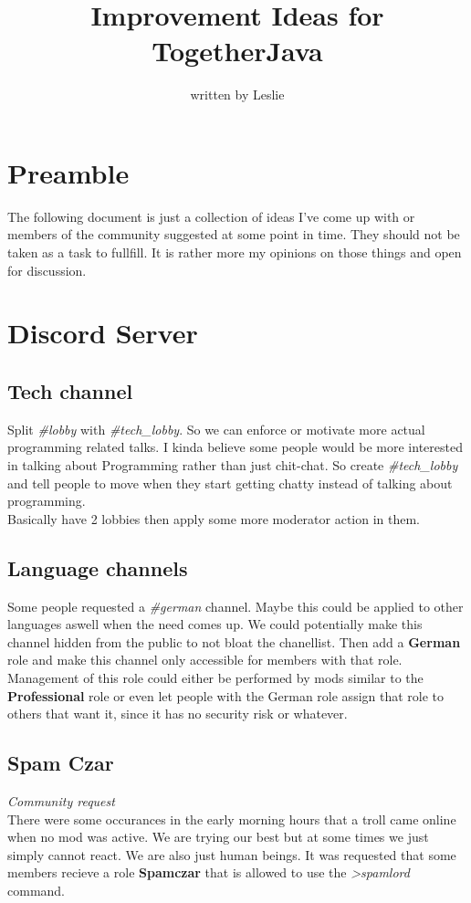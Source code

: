 \documentclass{article}
\title{Improvement Ideas for TogetherJava}
\date{}
\author{written by Leslie}
\begin{document}
    \maketitle
    \tableofcontents
    \newpage

    \section{Preamble}
    The following document is just a collection of ideas I've come up with or members of the community suggested at some point in time.
    They should not be taken as a task to fullfill. It is rather more my opinions on those things and open for discussion.

    \section{Discord Server}

    \subsection{Tech channel}
    Split \textit{\#lobby} with \textit{\#tech\_lobby}. So we can enforce or motivate more actual programming related talks. 
    I kinda believe some people would be more interested in talking about Programming rather than just chit-chat.
    So create \textit{\#tech\_lobby} and tell people to move when they start getting chatty instead of talking about programming. \\ 
    Basically have 2 lobbies then apply some more moderator action in them.

    \subsection{Language channels}
    Some people requested a \textit{\#german} channel. Maybe this could be applied to other languages aswell when the need comes up.
    We could potentially make this channel hidden from the public to not bloat the chanellist. 
    Then add a \textbf{German} role and make this channel only accessible for members with that role. 
    Management of this role could either be performed by mods similar to the \textbf{Professional} 
    role or even let people with the German role assign that role to others that want it, since it has no security risk or whatever.

    \subsection{Spam Czar}
    \textit{Community request} \\ \newline
    There were some occurances in the early morning hours that a troll came online when no mod was active. 
    We are trying our best but at some times we just simply cannot react. We are also just human beings.
    It was requested that some members recieve a role \textbf{Spamczar} that is allowed to use the \textit{>spamlord} command.
\end{document}
